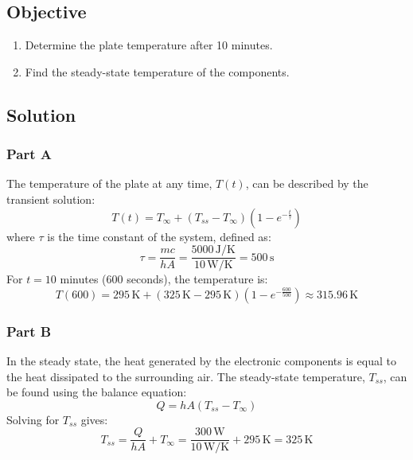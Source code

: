 \documentclass{article}
\numberwithin{equation}{section}
\begin{document}
\subsection*{Objective}
\begin{enumerate}
    \item Determine the plate temperature after 10 minutes.
    \item Find the steady-state temperature of the components.
\end{enumerate}

\subsection*{Solution}

\subsubsection*{Part A}
The temperature of the plate at any time, $T(t)$, can be described by the transient solution:
\begin{equation}
    T(t) = T_{\infty} + (T_{ss} - T_{\infty})(1 - e^{-\frac{t}{\tau}})
\end{equation}
where $\tau$ is the time constant of the system, defined as:
\begin{equation}
    \tau = \frac{mc}{hA} = \frac{5000 \, \text{J/K}}{10 \, \text{W/K}} = 500 \, \text{s}
\end{equation}
For $t = 10$ minutes ($600$ seconds), the temperature is:
\begin{equation}
    T(600) = 295 \, \text{K} + (325 \, \text{K} - 295 \, \text{K})(1 - e^{-\frac{600}{500}}) \approx 315.96 \, \text{K}
\end{equation}

\subsubsection*{Part B}
In the steady state, the heat generated by the electronic components is equal to the heat dissipated to the surrounding air. The steady-state temperature, $T_{ss}$, can be found using the balance equation:
\begin{equation}
    Q = hA(T_{ss} - T_{\infty})
\end{equation}
Solving for $T_{ss}$ gives:
\begin{equation}
    T_{ss} = \frac{Q}{hA} + T_{\infty} = \frac{300 \, \text{W}}{10 \, \text{W/K}} + 295 \, \text{K} = 325 \, \text{K}
\end{equation}
\end{document}
